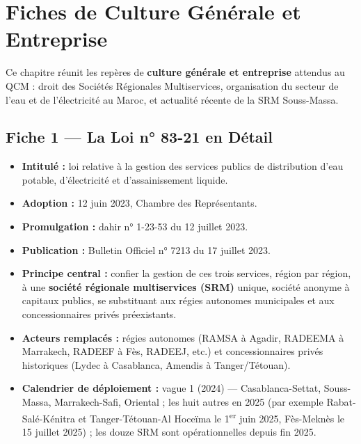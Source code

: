 \chapter{Fiches de Culture Générale et Entreprise}

Ce chapitre réunit les repères de \textbf{culture générale et entreprise} attendus au QCM : droit des Sociétés Régionales Multiservices, organisation du secteur de l'eau et de l'électricité au Maroc, et actualité récente de la SRM Souss-Massa.

\section{Fiche 1 --- La Loi n° 83-21 en Détail}
\begin{itemize}
    \item \textbf{Intitulé :} loi relative à la gestion des services publics de distribution d'eau potable, d'électricité et d'assainissement liquide.
    \item \textbf{Adoption :} 12 juin 2023, Chambre des Représentants.
    \item \textbf{Promulgation :} dahir n° 1-23-53 du 12 juillet 2023.
    \item \textbf{Publication :} Bulletin Officiel n° 7213 du 17 juillet 2023.
    \item \textbf{Principe central :} confier la gestion de ces trois services, région par région, à une \textbf{société régionale multiservices (SRM)} unique, société anonyme à capitaux publics, se substituant aux régies autonomes municipales et aux concessionnaires privés préexistants.
    \item \textbf{Acteurs remplacés :} régies autonomes (RAMSA à Agadir, RADEEMA à Marrakech, RADEEF à Fès, RADEEJ, etc.) et concessionnaires privés historiques (Lydec à Casablanca, Amendis à Tanger/Tétouan).
    \item \textbf{Calendrier de déploiement :} vague 1 (2024) --- Casablanca-Settat, Souss-Massa, Marrakech-Safi, Oriental ; les huit autres en 2025 (par exemple Rabat-Salé-Kénitra et Tanger-Tétouan-Al Hoceïma le 1\textsuperscript{er} juin 2025, Fès-Meknès le 15 juillet 2025) ; les douze SRM sont opérationnelles depuis fin 2025.
\end{itemize}


